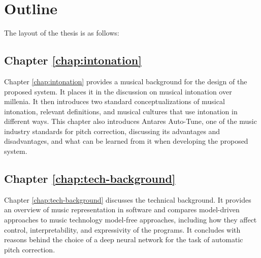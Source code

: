 
\section{Outline}
The layout of the thesis is as follows:

\subsection{Chapter \ref{chap:intonation}}
Chapter \ref{chap:intonation} provides a musical background for the design of the proposed system. It places it in the discussion on musical intonation over millenia. It then introduces two standard conceptualizations of musical intonation, relevant definitions, and musical cultures that use intonation in different ways. This chapter also introduces Antares Auto-Tune, one of the music industry standards for pitch correction, discussing its advantages and disadvantages, and what can be learned from it when developing the proposed system.

\subsection{Chapter \ref{chap:tech-background}}
Chapter \ref{chap:tech-background} discusses the technical background. It provides an overview of music representation in software and compares model-driven approaches to music technology model-free approaches,  including how they affect control, interpretability, and expressivity of the programs. It concludes with reasons behind the choice of a deep neural network for the task of automatic pitch correction.

